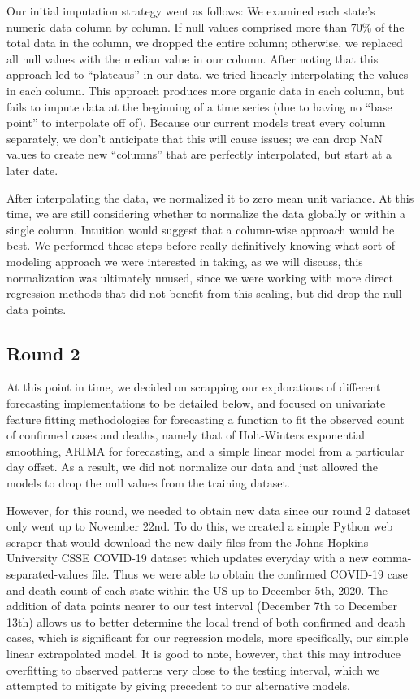 \documentclass[sigconf,nonacm]{acmart}
\begin{document}
Our initial imputation strategy went as follows: We examined each state’s
numeric data column by column. If null values comprised more than 70\% of the
total data in the column, we dropped the entire column; otherwise, we replaced
all null values with the median value in our column. After noting that this
approach led to “plateaus” in our data, we tried linearly interpolating the
values in each column. This approach produces more organic data in each column,
but fails to impute data at the beginning of a time series (due to having no
“base point” to interpolate off of). Because our current models treat every
column separately, we don’t anticipate that this will cause issues; we can drop
NaN values to create new “columns” that are perfectly interpolated, but start
at a later date.  

After interpolating the data, we normalized it to zero mean unit variance. At
this time, we are still considering whether to normalize the data globally or
within a single column. Intuition would suggest that a column-wise approach
would be best. We performed these steps before really definitively knowing what
sort of modeling approach we were interested in taking, as we will discuss,
this normalization was ultimately unused, since we were working with more
direct regression methods that did not benefit from this scaling, but did drop
the null data points.

\subsection{Round 2}
At this point in time, we decided on scrapping our explorations of different
forecasting implementations to be detailed below, and focused on univariate
feature fitting methodologies for forecasting a function to fit the observed
count of confirmed cases and deaths, namely that of Holt-Winters exponential
smoothing, ARIMA for forecasting, and a simple linear model from a particular
day offset. As a result, we did not normalize our data and just allowed the
models to drop the null values from the training dataset.

However, for this round, we needed to obtain new data since our round 2 dataset
only went up to November 22nd. To do this, we created a simple Python web scraper that 
would download the new daily files from the Johns Hopkins University CSSE COVID-19 
dataset \cite{JHUdataset} which updates everyday with a new comma-separated-values file.
Thus we were able to obtain the confirmed COVID-19 case and death count of each state
within the US up to December 5th, 2020. The addition of data points nearer to our test 
interval (December 7th to December 13th) allows us to better determine the local trend 
of both confirmed and death cases, which is significant for our regression models, more 
specifically, our simple linear extrapolated model. It is good to note, however, that this may 
introduce overfitting to observed patterns very close to the testing interval, 
which we attempted to mitigate by giving precedent to our alternative models.
\end{document}
